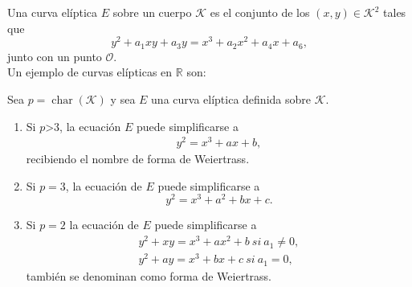 Una curva elíptica $E$ sobre un cuerpo $\mathcal{K}$ es el conjunto de los $(x,y)\in \mathcal{K}^2$ tales que
$$
	y^2+a_1xy+a_3y = x^3+a_2x^2+a_4x+a_6,
$$
junto con un punto $\mathcal{O}$.\\
Un ejemplo de curvas elípticas en $\mathbb{R}$ son:
\begin{figure}[htb]
	\centering
	\qquad
\end{figure}

\begin{proposicion}
		Sea $p=\operatorname{char}(\mathcal{K})$ y sea $E$ una curva elíptica definida sobre $\mathcal{K}$.
		\begin{enumerate}
			\item Si $p$\textgreater$3$, la ecuación $E$ puede simplificarse a
		\begin{align}
			y^2=x^3+ax+b,\label{eq:tipo1}
		\end{align}
		recibiendo el nombre de forma de Weiertrass.
			\item Si $p=3$, la ecuación de $E$ puede simplificarse a 
		\begin{equation}
			y^2=x^3+a^2+bx+c.
		\end{equation}
			\item Si $p=2$ la ecuación de $E$ puede simplificarse a 
				\begin{align}
					y^2+xy=x^3+ax^2+b \: si\: a_1 \neq 0,\label{eq:uno}\\
					y^2+ay=x^3+bx+c \: si\: a_1=0,\label{eq:dos}
				\end{align}
		también se denominan como forma de Weiertrass.
		\end{enumerate}
\end{proposicion}

